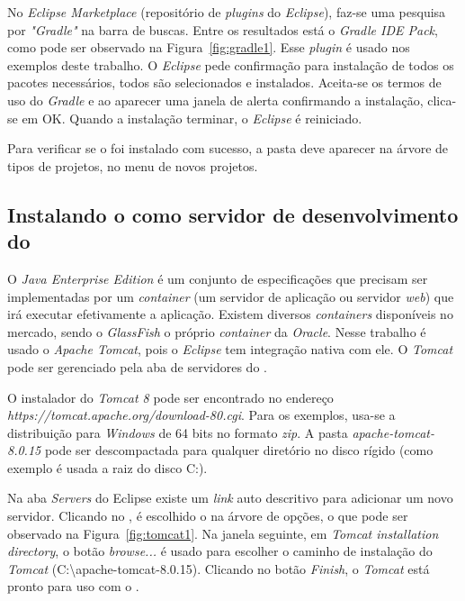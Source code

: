No \textit{Eclipse Marketplace} (repositório de \textit{plugins} do \textit{Eclipse}), faz-se uma pesquisa por \textit{"Gradle"} na barra de buscas. Entre os resultados está o \textit{Gradle IDE Pack}, como pode ser observado na Figura~\ref{fig:gradle1}. Esse \textit{plugin} é usado nos exemplos deste trabalho. O \textit{Eclipse} pede confirmação para instalação de todos os pacotes necessários, todos são selecionados e instalados. Aceita-se os termos de uso do \textit{Gradle} e ao aparecer uma janela de alerta confirmando a instalação, clica-se em OK. Quando a instalação terminar, o \textit{Eclipse} é reiniciado.

Para verificar se o  foi instalado com sucesso, a pasta  deve aparecer na árvore de tipos de projetos, no menu de novos projetos.


\subsection{Instalando o  como servidor de desenvolvimento do } 

O \textit{Java Enterprise Edition} é um conjunto de especificações que precisam ser implementadas por um \textit{container} (um servidor de aplicação ou servidor \textit{web}) que irá executar efetivamente a aplicação. Existem diversos \textit{containers} disponíveis no mercado, sendo o \textit{GlassFish} o próprio \textit{container} da \textit{Oracle}. Nesse trabalho é usado o \textit{Apache Tomcat}, pois o \textit{Eclipse} tem integração nativa com ele. O \textit{Tomcat} pode ser gerenciado pela aba de servidores do .

O instalador do \textit{Tomcat 8} pode ser encontrado no endereço \textit{https://tomcat.apache.org/download-80.cgi}. Para os exemplos, usa-se a distribuição para \textit{Windows} de 64 bits no formato \textit{zip}. A pasta \textit{apache-tomcat-8.0.15} pode ser descompactada para qualquer diretório no disco rígido (como exemplo é usada a raiz do disco C:).  

Na aba \textit{Servers} do Eclipse existe um \textit{link} auto descritivo para adicionar um novo servidor. Clicando no , é escolhido o  na árvore de opções, o que pode ser observado na Figura~\ref{fig:tomcat1}. Na janela seguinte, em \textit{Tomcat installation directory}, o botão \textit{browse...} é usado para escolher o caminho de instalação do \textit{Tomcat} (C:\textbackslash apache-tomcat-\textmd{8.0.15}). Clicando no botão \textit{Finish}, o \textit{Tomcat} está pronto para uso com o . 

